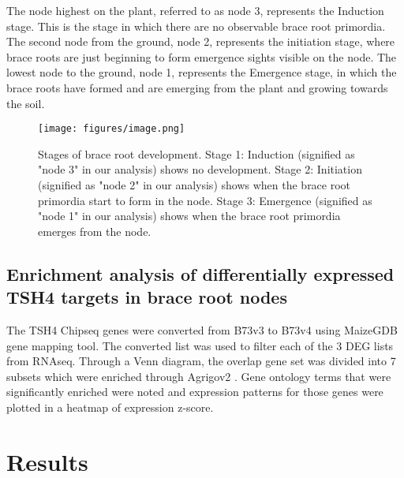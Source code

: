 The node highest on the plant, referred to as node 3, represents the Induction stage. This is the stage in which there are no observable brace root primordia. The second node from the ground, node 2, represents the initiation stage, where brace roots are just beginning to form emergence sights visible on the node. The lowest node to the ground, node 1, represents the Emergence stage, in which the brace roots have formed and are emerging from the plant and growing towards the soil.  
\begin{figure}[H]
    \centering
    \begin{mdframed}[backgroundcolor=green!20]
    \texttt{[image: figures/image.png]}
    \caption{Stages of brace root development. Stage 1: Induction (signified as "node 3" in our analysis) shows no development. Stage 2: Initiation (signified as "node 2" in our analysis) shows when the brace root primordia start to form in the node. Stage 3: Emergence (signified as "node 1" in our analysis) shows when the brace root primordia emerges from the node. }
    \end{mdframed}
\end{figure}
\subsection{Enrichment analysis of differentially expressed TSH4 targets in brace root nodes}
The TSH4 Chipseq genes were converted from B73v3 to B73v4 using MaizeGDB gene mapping tool. \cite{Woodhouse2021} The converted list was used to filter each of the 3 DEG lists from RNAseq. Through a Venn diagram, the overlap gene set was divided into 7 subsets which were enriched through Agrigov2 \cite{Tian2017}. Gene ontology terms that were significantly enriched were noted and expression patterns for those genes were plotted in a heatmap of expression z-score.

\section{Results}
